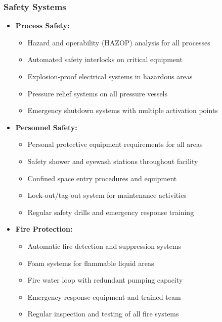 \subsubsection{Safety Systems}
\begin{itemize}
    \item \textbf{Process Safety:}
    \begin{itemize}
        \item Hazard and operability (HAZOP) analysis for all processes
        \item Automated safety interlocks on critical equipment
        \item Explosion-proof electrical systems in hazardous areas
        \item Pressure relief systems on all pressure vessels
        \item Emergency shutdown systems with multiple activation points
    \end{itemize}
    
    \item \textbf{Personnel Safety:}
    \begin{itemize}
        \item Personal protective equipment requirements for all areas
        \item Safety shower and eyewash stations throughout facility
        \item Confined space entry procedures and equipment
        \item Lock-out/tag-out system for maintenance activities
        \item Regular safety drills and emergency response training
    \end{itemize}
    
    \item \textbf{Fire Protection:}
    \begin{itemize}
        \item Automatic fire detection and suppression systems
        \item Foam systems for flammable liquid areas
        \item Fire water loop with redundant pumping capacity
        \item Emergency response equipment and trained team
        \item Regular inspection and testing of all fire systems
    \end{itemize}
\end{itemize}

